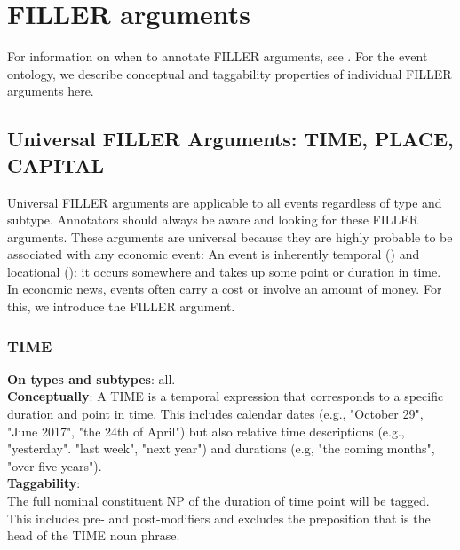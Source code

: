 \vspace{0.5cm}

\section{FILLER arguments} \label{sec:FILLERtypes}

\justify
For information on when to annotate FILLER arguments, see .
For the event ontology, we describe conceptual and taggability properties of individual FILLER arguments here.

\subsection{Universal FILLER Arguments: TIME, PLACE, CAPITAL}

\justify
Universal FILLER arguments are applicable to all events regardless of type and subtype.
Annotators should always be aware and looking for these FILLER arguments.
These arguments are universal because they are highly probable to be associated with any economic event:
An event is inherently temporal () and locational (): it occurs somewhere and takes up some point or duration in time.
In economic news, events often carry a cost or involve an amount of money. For this, we introduce the  FILLER argument.

\hypertarget{TIME}{
\subsubsection{TIME}}

\justify
\noindent\textbf{On types and subtypes}: all.\\[6pt]
\noindent\textbf{Conceptually}:
A TIME is a temporal expression that corresponds to a specific duration and point in time.
This includes calendar dates (e.g., "October 29", "June 2017", "the 24th of April") but also relative time descriptions (e.g., "yesterday". "last week", "next year") and durations (e.g, "the coming months", "over five years").\\

\noindent\textbf{Taggability}:\\
The full nominal constituent NP of the duration of time point will be tagged.
This includes pre- and post-modifiers and excludes the preposition that is the head of the TIME noun phrase.

\begin{exe}
    \ex {}
    \ex {}
    \ex {}
    \ex {}
    \ex {}
    \ex {}
\end{exe}

